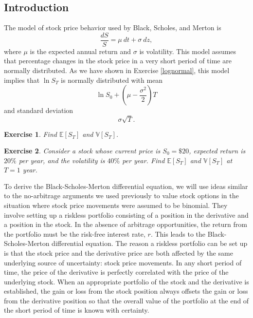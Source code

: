 \documentclass[letterpaper,10pt]{article}
\newtheorem{ex}{Exercise}
\begin{document}
\subsection{Introduction}

\noindent The model of stock price behavior used by Black, Scholes, and Merton is $$\frac{dS}{S}=\mu \:dt+\sigma\:dz,$$ where $\mu$ is the expected annual return and $\sigma$ is volatility. This model assumes that percentage changes in the stock price in a very short period of time are normally distributed.  As we have shown in Exercise \ref{lognormal}, this model implies that $\ln S_T$ is normally distributed with mean $$\ln S_0+\left(\mu-\frac{\sigma^2}{2}\right)T$$ and standard deviation $$\sigma\sqrt{T}.$$


\begin{ex}
Find $\mathbb{E}[S_T]$ and $\mathbb{V}[S_T]$.
\end{ex}


\begin{ex}
Consider a stock whose current price is $S_0=\$20$, expected return is $20\%$ per year, and the volatility is $40\%$ per year.  Find $\mathbb{E}[S_T]$ and $\mathbb{V}[S_T]$ at $T=1$ year.
\end{ex}

\noindent To derive the Black-Scholes-Merton differential equation, we will use ideas similar to the no-arbitrage arguments we used previously to value stock options in the situation where stock price movements were assumed to be binomial.  They involve setting up a riskless portfolio consisting of a position in the derivative and a position in the stock. In the absence of arbitrage opportunities, the return from the portfolio must be the risk-free interest rate, $r$. This leads to the Black-Scholes-Merton differential equation.  The reason a riskless portfolio can be set up is that the stock price and the derivative price are both affected by the same underlying source of uncertainty: stock price movements. In any short period of time, the price of the derivative is perfectly correlated with the price of the underlying stock. When an appropriate portfolio of the stock and the derivative is established, the gain or loss from the stock position always offsets the gain or loss from the derivative position so that the overall value of the portfolio at the end of the short period of time is known with certainty.
\end{document}
